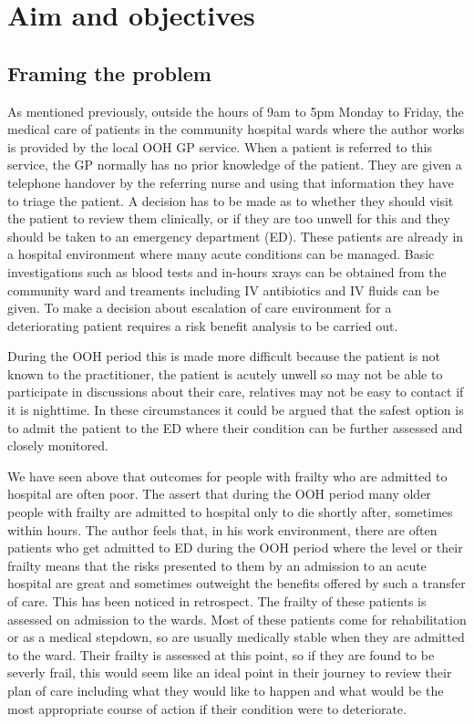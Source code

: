 \documentclass
[
	12pt,
	a4paper,
	oneside,
]{article}
\begin{document}
\section{Aim and objectives}
\subsection{Framing the problem}
As mentioned previously, outside the hours of 9am to 5pm Monday to Friday, the medical
care of patients in the community hospital wards where the author works is provided
by the local OOH GP service. When a patient
is referred to this service, the GP normally has no prior knowledge of the patient. They are
given a telephone handover by the referring nurse and using that information
they have to triage the patient. A decision has to be made as to whether they should visit
the patient to review them clinically, or if they are too unwell for this and they 
should be taken to an emergency department (ED). These patients
are already in a hospital environment where many acute conditions can be managed.
Basic investigations such as blood tests and in-hours xrays can be obtained from the community
ward and treaments including IV antibiotics and IV fluids can be given.
To make a decision about escalation of care environment for a deteriorating patient
requires a risk benefit analysis to be carried out. 

During the OOH period this is 
made more difficult because the patient is not known to the practitioner, the patient
is acutely unwell so may not be able to participate in discussions about their care,
relatives may not be easy to contact if it is nighttime. In these circumstances it could
be argued that the safest option is to admit the patient to the ED where their 
condition can be further assessed and closely monitored. 

We have seen above that outcomes for people with frailty who are admitted to hospital
are often poor. The \textcite{silver:12} assert that during the OOH period many older
people with frailty are admitted to hospital only to die shortly after, sometimes within
hours. The author feels that, in his work environment, there are often 
patients who get admitted to ED during the OOH period where the level or their frailty
means that the risks presented to them by an admission to an acute hospital are great
and sometimes outweight the benefits offered by such a transfer of care. This has
been noticed in retrospect. The frailty of these patients is assessed on admission
to the wards. Most of these patients come for rehabilitation or as a medical stepdown,
so are usually medically stable when they are admitted to the ward. Their frailty 
is assessed at this point, so if they are found to be severly frail, this would
seem like an ideal point in their journey to review their plan of care including
what they would like to happen and what would be the most appropriate course of 
action if their condition were to deteriorate.
\end{document}
